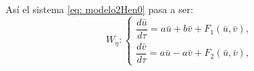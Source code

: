 Así el sistema \eqref{eq: modelo2Hen0} pasa a ser:
\begin{equation}
	W_{\eta}:
	\begin{cases}
		\dfrac{d\bar{u}}{d \tau} = a\bar{u} + b\bar{v} + F_1(\bar{u}, \bar{v}),\\
		\dfrac{d\bar{v}}{d \tau} = a\bar{u} - a\bar{v} + F_2(\bar{u}, \bar{v}),
	\end{cases}
	\label{eq: formaBifHopf}
\end{equation}
